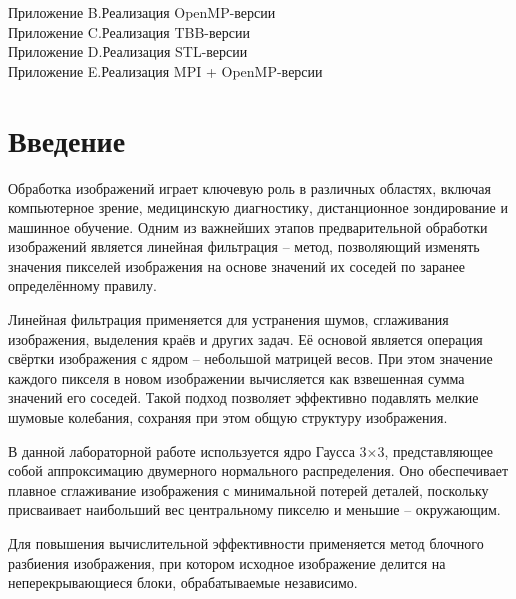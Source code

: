 \documentclass[14pt, a4paper]{extarticle}
\begin{document}
\hspace*{0.5cm}Приложение B.\hspace{0.5em}Реализация OpenMP-версии  \\
\hspace*{0.5cm}Приложение C.\hspace{0.5em}Реализация TBB-версии  \\
\hspace*{0.5cm}Приложение D.\hspace{0.5em}Реализация STL-версии  \\
\hspace*{0.5cm}Приложение E.\hspace{0.5em}Реализация MPI + OpenMP-версии  \\

\newpage

\section*{Введение}

Обработка изображений играет ключевую роль в различных областях, включая компьютерное зрение, медицинскую диагностику, дистанционное зондирование и машинное обучение. Одним из важнейших этапов предварительной обработки изображений является линейная фильтрация – метод, позволяющий изменять значения пикселей изображения на основе значений их соседей по заранее определённому правилу.

Линейная фильтрация применяется для устранения шумов, сглаживания изображения, выделения краёв и других задач. Её основой является операция свёртки изображения с ядром – небольшой матрицей весов. При этом значение каждого пикселя в новом изображении вычисляется как взвешенная сумма значений его соседей. Такой подход позволяет эффективно подавлять мелкие шумовые колебания, сохраняя при этом общую структуру изображения.

В данной лабораторной работе используется ядро Гаусса 3×3, представляющее собой аппроксимацию двумерного нормального распределения. Оно обеспечивает плавное сглаживание изображения с минимальной потерей деталей, поскольку присваивает наибольший вес центральному пикселю и меньшие – окружающим.

Для повышения вычислительной эффективности применяется метод блочного разбиения изображения, при котором исходное изображение делится на неперекрывающиеся блоки, обрабатываемые независимо.

\newpage
\end{document}
